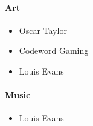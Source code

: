 \documentclass{book}
\begin{document}
	\paragraph{Art}
	\begin{itemize}
		\item Oscar Taylor
		\item Codeword Gaming
		\item Louis Evans
	\end{itemize}
	
	\paragraph{Music}
	\begin{itemize}
		\item Louis Evans
	\end{itemize}
\end{document}
